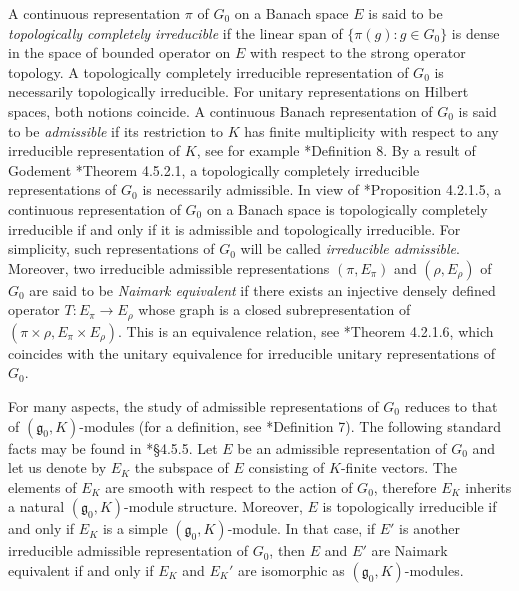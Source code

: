 \documentclass{amsart}
\theoremstyle{definition}
\begin{document}
A continuous representation $\pi$ of $G_0$ on a Banach space $E$ is said to be \textit{topologically completely irreducible} if the linear span of $\{\pi(g) : g \in G_0\}$ is dense in the space of bounded operator on $E$ with respect to the strong operator topology. A topologically completely irreducible representation of $G_0$ is necessarily topologically irreducible. For unitary representations on Hilbert spaces, both notions coincide. A continuous Banach representation of $G_0$ is said to be \textit{admissible} if its restriction to $K$ has finite multiplicity with respect to any irreducible representation of $K$, see for example \cite{Baldoni}*{Definition 8}. By a result of Godement \cite{Warner}*{Theorem 4.5.2.1}, a topologically completely irreducible representations of $G_0$ is necessarily admissible. In view of \cite{Warner}*{Proposition 4.2.1.5}, a continuous representation of $G_0$ on a Banach space is topologically completely irreducible if and only if it is admissible and topologically irreducible. For simplicity, such representations of $G_0$ will be called \textit{irreducible admissible}. Moreover, two irreducible admissible representations $(\pi, E_\pi)$ and $(\rho, E_\rho)$ of $G_0$ are said to be \textit{Naimark equivalent} if there exists an injective densely defined operator $T : E_\pi \to E_\rho$ whose graph is a closed subrepresentation of $(\pi\!\times\!\rho, E_\pi\! \times \!E_\rho)$. This is an equivalence relation, see \cite{Warner}*{Theorem 4.2.1.6}, which coincides with the unitary equivalence for irreducible unitary representations of $G_0$.

For many aspects, the study of admissible representations of $G_0$ reduces to that of $(\mathfrak{g}_0, K)$-modules (for a definition, see \cite{Baldoni}*{Definition 7}). The following standard facts may be found in \cite{Warner}*{§4.5.5}. Let $E$ be an admissible representation of $G_0$ and let us denote by $E_K$ the subspace of $E$ consisting of $K$-finite vectors. The elements of $E_K$ are smooth with respect to the action of $G_0$, therefore $E_K$ inherits a natural $(\mathfrak{g}_0, K)$-module structure. Moreover, $E$ is topologically irreducible if and only if $E_K$ is a simple $(\mathfrak{g}_0,K)$-module. In that case, if $E'$ is another irreducible admissible representation of $G_0$, then $E$ and $E'$ are Naimark equivalent if and only if $E_K$ and $E_K'$ are isomorphic as $(\mathfrak{g}_0, K)$-modules.
\end{document}
